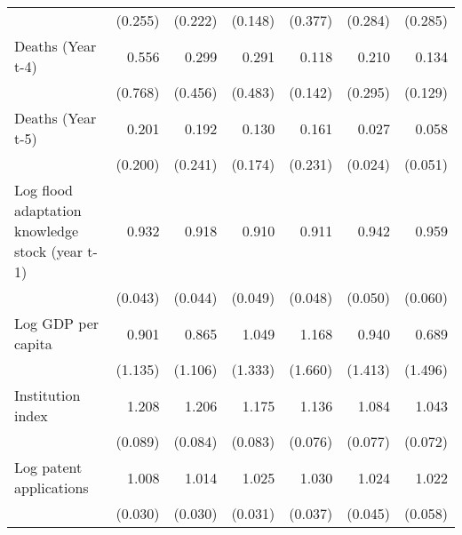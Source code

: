 \begin{table}[htbp]
\begin{tabular}{l*{6}{D{.}{.}{-1}}}
                    &     (0.255)         &     (0.222)         &     (0.148)         &     (0.377)         &     (0.284)         &     (0.285)         \\
\addlinespace
Deaths (Year t-4)   &       0.556         &       0.299         &       0.291         &       0.118\sym{*}  &       0.210         &       0.134\sym{**} \\
                    &     (0.768)         &     (0.456)         &     (0.483)         &     (0.142)         &     (0.295)         &     (0.129)         \\
\addlinespace
Deaths (Year t-5)   &       0.201         &       0.192         &       0.130         &       0.161         &       0.027\sym{***}&       0.058\sym{***}\\
                    &     (0.200)         &     (0.241)         &     (0.174)         &     (0.231)         &     (0.024)         &     (0.051)         \\
\addlinespace
Log flood adaptation knowledge stock (year t-1)&       0.932         &       0.918\sym{*}  &       0.910\sym{*}  &       0.911\sym{*}  &       0.942         &       0.959         \\
                    &     (0.043)         &     (0.044)         &     (0.049)         &     (0.048)         &     (0.050)         &     (0.060)         \\
\addlinespace
Log GDP per capita  &       0.901         &       0.865         &       1.049         &       1.168         &       0.940         &       0.689         \\
                    &     (1.135)         &     (1.106)         &     (1.333)         &     (1.660)         &     (1.413)         &     (1.496)         \\
\addlinespace
Institution index   &       1.208\sym{**} &       1.206\sym{***}&       1.175\sym{**} &       1.136\sym{*}  &       1.084         &       1.043         \\
                    &     (0.089)         &     (0.084)         &     (0.083)         &     (0.076)         &     (0.077)         &     (0.072)         \\
\addlinespace
Log patent applications&       1.008         &       1.014         &       1.025         &       1.030         &       1.024         &       1.022         \\
                    &     (0.030)         &     (0.030)         &     (0.031)         &     (0.037)         &     (0.045)         &     (0.058)         \\

\end{tabular}
\end{table}
